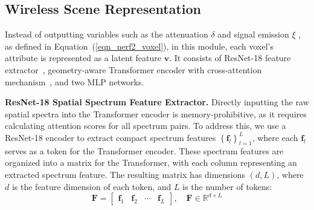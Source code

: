 \subsection{Wireless Scene Representation}


Instead of outputting variables such as the attenuation \( \delta \) and signal emission \( \xi \) , as defined in Equation~(\ref{eqn_nerf2_voxel}), in this module, each voxel's attribute is represented as a latent feature $\mathbf{v}$.
It consists of ResNet-18 feature extractor~\cite{he2016deep}, geometry-aware Transformer encoder with cross-attention mechanism~\cite{gheini2021cross}, and two MLP networks.



\textbf{ResNet-18 Spatial Spectrum Feature Extractor.}  
Directly inputting the raw spatial spectra into the Transformer encoder is memory-prohibitive, as it requires calculating attention scores for all spectrum pairs. To address this, we use a ResNet-18 encoder to extract compact spectrum features \( \left\{\mathbf{f}_l\right\}_{l=1}^{L} \), where each \( \mathbf{f}_l \) serves as a token for the Transformer encoder. 
These spectrum features are organized into a matrix for the Transformer, with each column representing an extracted spectrum feature. The resulting matrix has dimensions \( (d, L) \), where \( d \) is the feature dimension of each token, and \( L \) is the number of tokens:
\begin{equation}
\label{eqn_matrix_f}
    \mathbf{F} = \begin{bmatrix} \mathbf{f}_1 & \mathbf{f}_2 & \cdots & \mathbf{f}_L \end{bmatrix}, \quad \mathbf{F} \in \mathbb{R}^{d \times L}
\end{equation}


